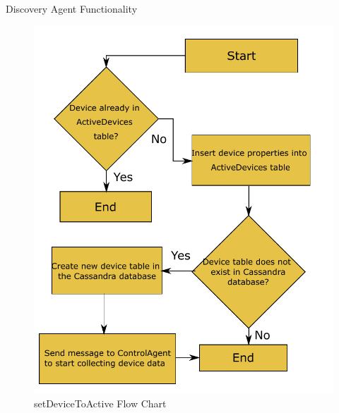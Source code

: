 \documentclass{beamer}
\begin{document}
\begin{frame}{Discovery Agent Functionality}{}
    \begin{figure}
        \centering
        \includegraphics[scale=0.4]{figs/setDeviceToActiveFlow.pdf}
        \caption{setDeviceToActive Flow Chart}
        \label{fig:setDeviceToActive}
    \end{figure}
\end{frame}
\end{document}
